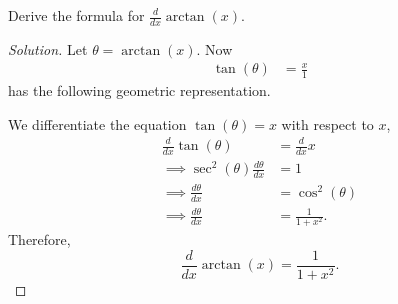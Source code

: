 \documentclass[compacto,10pt,comentarios]{aleph-notas}
\begin{document}
\begin{ejer}
    Derive the formula for $\frac{d}{dx} \arctan(x)$.
\end{ejer}
\begin{proof}[Solution]
    Let $\theta = \arctan(x)$. Now
    \begin{align*}
        \tan\left(\theta\right) & = \frac{x}{1}
    \end{align*}
    has the following geometric representation.
    \begin{center}
    \end{center}
    We differentiate the equation $\tan(\theta) = x$ with respect to $x$,
    \begin{align*}
    \frac{d}{dx} \tan(\theta) & = \frac{d}{dx} x \\
    \implies \sec^{2}(\theta) \frac{d\theta}{dx} & = 1 \\
    \implies \frac{d\theta}{dx} & = \cos^{2}(\theta) \\
    \implies \frac{d\theta}{dx} & = \frac{1}{1+x^{2}}.
    \end{align*}
    Therefore,
    $$
    \frac{d}{dx} \arctan(x) = \frac{1}{1 + x^2}.
    $$
\end{proof}
\end{document}
